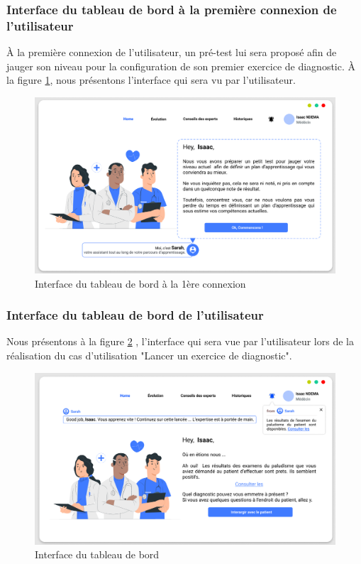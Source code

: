 \subsubsection{Interface du tableau de bord à la première connexion de l'utilisateur}
À la première connexion de l'utilisateur, un pré-test lui sera proposé afin de jauger son niveau pour la configuration de son premier exercice de diagnostic. À la figure \ref{fig:dashboard_first}, nous présentons l'interface qui sera vu par l'utilisateur.
\begin{figure}[H]
    \centering
    \includegraphics[width=\textwidth]{figures/dashboard-first-connection.png}
        \captionsetup{justification=centering}
    \caption{Interface du tableau de bord à la 1ère connexion}
    \label{fig:dashboard_first}
\end{figure}

\subsubsection{Interface du tableau de bord  de l'utilisateur}
Nous présentons à la figure \ref{fig:dashboard} , l'interface qui sera vue par l'utilisateur lors de la réalisation du cas d'utilisation "Lancer un exercice de diagnostic".
\begin{figure}[H]
    \centering
    \includegraphics[width=\textwidth]{figures/dashboard.png}
        \captionsetup{justification=centering}
    \caption{Interface du tableau de bord}
    \label{fig:dashboard}
\end{figure}

